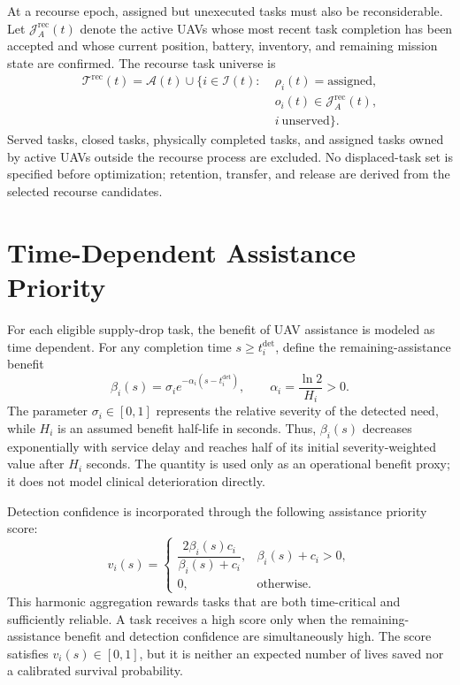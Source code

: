 \documentclass[conference]{IEEEtran}
\begin{document}
At a recourse epoch, assigned but unexecuted tasks must also be reconsiderable. Let $\mathcal J_A^{\mathrm{rec}}(t)$ denote the active UAVs whose most recent task completion has been accepted and whose current position, battery, inventory, and remaining mission state are confirmed. The recourse task universe is
\begin{equation}
\begin{split}
\mathcal T^{\mathrm{rec}}(t)=\mathcal A(t)\cup
\{i\in\mathcal I(t):\;&\rho_i(t)=\mathrm{assigned},\\
&o_i(t)\in\mathcal J_A^{\mathrm{rec}}(t),\\
&i\ \text{unserved}\}.
\end{split}
\end{equation}
Served tasks, closed tasks, physically completed tasks, and assigned tasks owned by active UAVs outside the recourse process are excluded. No displaced-task set is specified before optimization; retention, transfer, and release are derived from the selected recourse candidates.

\section{Time-Dependent Assistance Priority}
For each eligible supply-drop task, the benefit of UAV assistance is modeled as time dependent. For any completion time $s\geq t_i^{\mathrm{det}}$, define the remaining-assistance benefit
\begin{equation}
\beta_i(s)=\sigma_i e^{-\alpha_i(s-t_i^{\mathrm{det}})},\qquad
\alpha_i=\frac{\ln 2}{H_i}>0.
\end{equation}
The parameter $\sigma_i\in[0,1]$ represents the relative severity of the detected need, while $H_i$ is an assumed benefit half-life in seconds. Thus, $\beta_i(s)$ decreases exponentially with service delay and reaches half of its initial severity-weighted value after $H_i$ seconds. The quantity is used only as an operational benefit proxy; it does not model clinical deterioration directly.

Detection confidence is incorporated through the following assistance priority score:
\begin{equation}
v_i(s)=
\begin{cases}
\dfrac{2\beta_i(s)c_i}{\beta_i(s)+c_i},&\beta_i(s)+c_i>0,\\[4pt]
0,&\text{otherwise}.
\end{cases}\label{eq:value}
\end{equation}
This harmonic aggregation rewards tasks that are both time-critical and sufficiently reliable. A task receives a high score only when the remaining-assistance benefit and detection confidence are simultaneously high. The score satisfies $v_i(s)\in[0,1]$, but it is neither an expected number of lives saved nor a calibrated survival probability.
\end{document}
